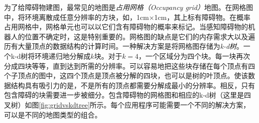 
为了给障碍物建图，最常见的地图是\emph{占用网格（Occupancy grid）}地图。在网格图中，将环境离散成任意分辨率的方块，如，1cm$\times$1cm，其上标有障碍物。在概率占用网格中，网格单元也可以以它们含有障碍物的概率来标记。当感知障碍物的机器人的位置不确定时，这是特别重要的。网格图的缺点是它们的内存需求大以及遍历有大量顶点的数据结构的计算时间。一种解决方案是将网格图存储为\emph{k-d树}。一个k-d树将环境递归地分解成$k$块。对于$k = 4$，一个区域分为四个块。每一块再次分成四块等等，直到达到所需的分辨率。可以容易地把这些块存储在每个顶点有四个子顶点的图中，这四个顶点是顶点被分解的四块，也可以是树的叶顶点。使该数据结构具有吸引力的是，不是所有的顶点都需要分解成最小的分辨率。相反，只有包含障碍的块需要进一步被细分。包含障碍物的网格图和相应的k-d树（这里是四叉树）如图\ref{fig:gridvskdtree}所示。每个应用程序可能需要一个不同的解决方案，可以是不同的地图类型的组合。


